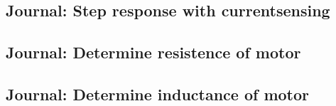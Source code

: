 \documentclass[../../main]{subfiles}
\begin{document}
\subsection{Journal: Step response with currentsensing}%
\label{sub:journal_stepresponse_with_currentsensing}

\subsection{Journal: Determine resistence of motor}%
\label{sub:journal_determine_resistence_of_motor}


\subsection{Journal: Determine inductance of motor}%
\label{sub:journal_determine_inductance_of_motor}

\end{document}
